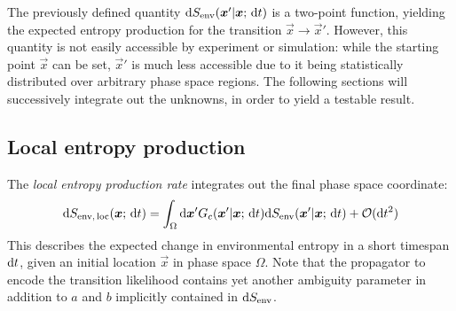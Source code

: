 The previously defined quantity \(\mathrm{d}S_\text{env}(\boldsymbol{x}'|\boldsymbol{x};\,\mathrm{d} t)\) is a two-point function, yielding the expected entropy production for the transition \(\vec x\to\vec x'\). However, this quantity is not easily accessible by experiment or simulation: while the starting point \(\vec x\) can be set, \(\vec x'\) is much less accessible due to it being statistically distributed over arbitrary phase space regions. The following sections will successively integrate out the unknowns, in order to yield a testable result.


\subsection{Local entropy production}

\newcommand\SEnvLoc{\ensuremath{S_\text{env,\,loc}}}

The \emph{local entropy production rate} integrates out the final phase space coordinate:
%
\begin{equation}
	\d\SEnvLoc(\vec x;\,\d t) = \int_\Omega\d\vec x' G_c(\vec x'|\vec x;\,\d t) \d\SEnv(\vec x'|\vec x;\,\d t) + \Cal O(\d t^2)
\end{equation}
%
This describes the expected change in environmental entropy in a short timespan \(\mathrm{d} t\), given an initial location \(\vec x\) in phase space \(\Omega\). Note that the propagator to encode the transition likelihood contains yet another ambiguity parameter in addition to \(a\) and \(b\) implicitly contained in \(\mathrm{d}S_\text{env}\).

